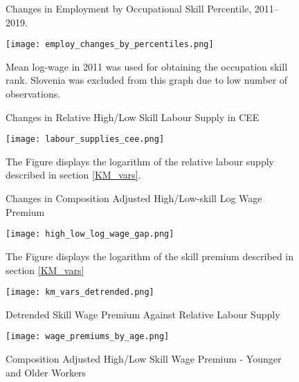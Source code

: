 \documentclass[11pt]{article}
\begin{document}
\begin{figure}[!htbp]%
    \centering
    \caption{Changes in Employment by Occupational Skill Percentile, 2011–2019.}
    {\texttt{[image: employ\_changes\_by\_percentiles.png]}
    }
    \label{employ_changes_percentiles}
    \caption*{\footnotesize Mean log-wage in 2011 was used for obtaining the occupation skill rank. Slovenia was excluded from this graph due to low number of observations. }
\end{figure}

\begin{figure}[!htbp]%
        \centering
        \caption{Changes in Relative High/Low Skill Labour Supply in CEE}
        {\texttt{[image: labour\_supplies\_cee.png]}}
        \label{labour_supplies_cee}
        \caption*{\footnotesize The Figure displays the logarithm of the relative labour supply described in section \ref{KM_vars}.}
\end{figure}

\begin{figure}[!htbp]%
    \centering
    \caption{Changes in Composition Adjusted High/Low-skill Log Wage Premium}
    {\texttt{[image: high\_low\_log\_wage\_gap.png]}}
    \label{high_low_log_wage_gap}
    \caption*{\footnotesize The Figure displays the logarithm of the skill premium described in section \ref{KM_vars}}
\end{figure}


\begin{figure}[!htbp]%
    \centering
    \caption{Detrended Skill Wage Premium Against Relative Labour Supply}
    {\texttt{[image: km\_vars\_detrended.png]} }
    \label{km_vars_detrended}
\end{figure}


\begin{figure}[!htbp]%
    \centering
    \caption{Composition Adjusted High/Low Skill Wage Premium -  Younger and Older Workers}
    {\texttt{[image: wage\_premiums\_by\_age.png]} }
    \label{wage_premiums_by_age}
\end{figure}


\FloatBarrier
\end{document}
